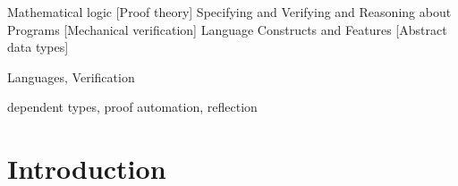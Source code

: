 \documentclass{sigplanconf}
\begin{document}
\begin{abstract}
\end{abstract}

			{Mathematical logic}
			[Proof theory]
			{Specifying and Verifying and Reasoning about Programs}
			[Mechanical verification]
			{Language Constructs and Features}
			[Abstract data types]


\terms
Languages, Verification

\keywords
dependent types, proof automation, reflection

\section{Introduction}
\end{document}
